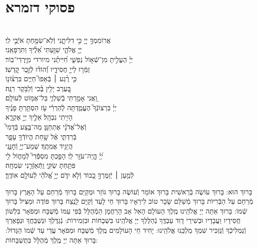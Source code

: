 \documentclass[twoside, openany, parskip=half, 11pt]{book}
\begin{document}
\section[פסוקי דזמרא]{ פסוקי דזמרא }
  \\
אֲרוֹמִמְךָ֣ יְיָ֭ כִּ֣י דִלִּיתָ֑נִי \hfill וְֿלֹֽא־שִׂמַּ֖חְתָּ אֹיְֿבַ֣י לִֽי׃\\
יְיָ֥ אֱלֹהָ֑י \hfill שִׁוַּ֥עְתִּי אֵ֝לֶ֗יךָ וַתִּרְפָּאֵֽנִי׃\\
יְיָ֗ הֶעֱלִ֣יתָ מִן־שְֿׁא֣וֹל נַפְשִׁ֑י \hfill חִ֝יִּיתַ֗נִי מיורדי מִיׇּֽרְדִי־בֽוֹר׃\\
זַמְּֿר֣וּ לַייָ֣ חֲסִידָ֑יו \hfill וְֿ֝הוֹד֗וּ לְֿזֵ֣כֶר קׇדְשֽׁוֹ׃\\
כִּ֤י רֶ֨גַע ׀ בְּֿאַפּוֹ֮ \hfill חַיִּ֢ים בִּרְצ֫וֹנ֥וֹ\\
בָּ֭עֶרֶב יָלִ֥ין בֶּ֗כִי \hfill וְֿלַבֹּ֥קֶר רִנָּֽה׃\\
וַ֭אֲנִי אָמַ֣רְתִּי בְֿשַׁלְוִ֑י \hfill בַּל־אֶמּ֥וֹט לְֿעוֹלָֽם׃\\
יְיָ֗ בִּרְצוֹנְֿךָ֮ הֶעֱמַ֢דְתָּה לְֽֿהַרְרִ֫י עֹ֥ז \hfill הִסְתַּ֥רְתָּ פָנֶ֗יךָ\\
הָיִ֥יתִי נִבְהָֽל׃ \hfill אֵלֶ֣יךָ יְיָ֣ אֶקְרָ֑א \\
וְֿאֶל־אֲ֝דֹנָ֗י אֶתְחַנָּֽן׃ \hfill מַה־בֶּ֥צַע בְּֿדָמִי֮\\
בְּֿרִדְתִּ֢י אֶ֫ל שָׁ֥חַת \hfill הֲיוֹדְֿךָ֥ עָפָ֑ר\\
הֲיַגִּ֥יד אֲמִתֶּֽךָ׃ \hfill שְׁמַע־יְיָ֥ וְֿחׇנֵּ֑נִי\\
יְ֝יָ֗ הֱֽיֵה־עֹזֵ֥ר לִֽי׃ \hfill הָפַ֣כְתָּ מִסְפְּֿֿדִי֮ לְֿמָח֢וֹל לִ֥י\\
פִּתַּ֥חְתָּ שַׂקִּ֑י \hfill וַֽתְּֿאַזְּֿרֵ֥נִי שִׂמְחָֽה׃\\
לְֿמַ֤עַן ׀ יְֿזַמֶּרְךָ֣ כָ֭בוֹד וְֿלֹ֣א יִדֹּ֑ם \hfill יְיָ֥ אֱ֝לֹהַ֗י לְֿעוֹלָ֥ם אוֹדֶֽךָּ׃ \\
\mournerskaddish


בָּרוּךְ הוּא:
בָּרוּךְ עוֹשֶׂה בְֿרֵאשִׁית בָּרוּךְ אוֹמֵר וְֿעוֹשֶׂה
בָּרוּךְ גּוֹזֵר וּמְקַיֵּם בָּרוּךְ מְֿרַחֵם עַל הָאָֽרֶץ
בָּרוּךְ מְֿרַחֵם עַל הַבְּֿרִיּוֹת בָּרוּךְ מְֿשַׁלֵּם שָׂכָר טוֹב לִירֵאָיו
בָּרוּךְ חַי לָעַד וְֿקַיָּם לָנֶֽצַח בָּרוּךְ פּוֹדֶה וּמַצִּיל בָּרוּךְ שְֿׁמוֹ:
בָּרוּךְ אַתָּה יְיָ אֱלֹהֵֽינוּ מֶֽלֶךְ הָעוֹלָם הָאֵל אָב הָרַחֲמָן הַמְֿהֻלָּל בְּֿפִי עַמּוֹ מְֿשֻׁבָּח וּמְפֹאָר בִּלְשׁוֹן חֲסִידָיו וַעֲבָדָיו וּבְשִׁירֵי דָוִד עַבְדֶּֽךָ נְֿהַלֶּלְךָ יְיָ אֱלֹהֵֽינוּ בִּשְׁבָחוֹת וּבִזְמִירוֹת: נְֿגַדֶּלְךָ וּנְשַׁבֵּחֲךָ וּנְפָאֶרְךָ וְֿנַמְלִיכְֿךָ וְֿנַזְכִּיר שִׁמְךָ מַלְכֵּֽנוּ אֱלֹהֵֽינוּ:
 יָחִיד חֵי הָעוֹלָמִים מֶֽלֶךְ מְֿשֻׁבָּח וּמְפֹאָר עֲדֵי עַד שְֿׁמוֹ הַגָּדוֹל: בָּרוּךְ אַתָּה יְיָ מֶֽלֶךְ מְֿהֻלָּל בַּתֻּשְׁבָּחוֹת:
\end{document}
